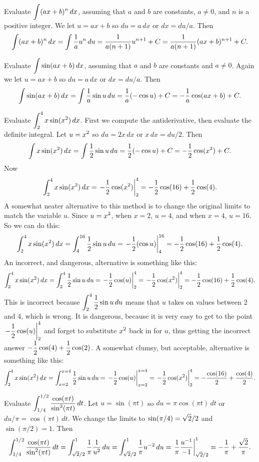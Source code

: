\example
Evaluate $\displaystyle\int(ax+b)^n\,dx$, assuming that $a$ and $b$ are
constants, $a\not=0$, and $n$ is a positive integer.
We let $u=ax+b$ so $du=a\,dx$ or $dx=du/a$. Then
$$
  \int(ax+b)^n\,dx=\int {1\over a} u^n\,du={1\over a(n+1)}u^{n+1}+C=
  {1\over a(n+1)}(ax+b)^{n+1}+C.
$$
\vskip-10pt\endexample

\example
Evaluate $\displaystyle\int \sin(ax+b)\,dx$, assuming that $a$ and $b$ are
constants and $a\not=0$.
Again we let $u=ax+b$ so $du=a\,dx$ or $dx=du/a$. Then
$$
  \int\sin(ax+b)\,dx=\int {1\over a} \sin u\,du={1\over a}(-\cos u)+C=
-{1\over a}\cos(ax+b)+C.
$$
\vskip-10pt\endexample

\example
Evaluate $\displaystyle\int_2^4 x\sin(x^2)\,dx$. First we compute the
antiderivative, then evaluate the definite integral.
Let $\displaystyle u=x^2$ so $du=2x\,dx$ or $x\,dx=du/2$. Then
$$
  \int x\sin(x^2)\,dx=\int {1\over 2} \sin u\,du={1\over 2}(-\cos u)+C=
  -{1\over 2}\cos(x^2)+C.
$$
Now
$$
  \int_2^4 x\sin(x^2)\,dx=\left.-{1\over 2}\cos(x^2)\right|_2^4
  =-{1\over 2}\cos(16)+{1\over 2}\cos(4).
$$
A somewhat neater alternative to this method is to change the original
limits to match the variable $u$. Since $\displaystyle u=x^2$, when $x=2$, $u=4$,
and when $x=4$, $u=16$. So we can do this:
$$
  \int_2^4 x\sin(x^2)\,dx=
  \int_4^{16} {1\over 2} \sin u\,du=\left.-{1\over 2}(\cos u)\right|_4^{16}
  =-{1\over 2}\cos(16)+{1\over 2}\cos(4).
$$
An incorrect, and dangerous, alternative is something like this:
$$
  \int_2^4 x\sin(x^2)\,dx=\int_2^4 {1\over 2} \sin u\,du=
  \left.-{1\over 2}\cos (u)\right|_2^4=
  \left.-{1\over 2}\cos(x^2)\right|_2^4=-{1\over 2}\cos(16)+{1\over
  2}\cos(4).
$$
This is incorrect because $\displaystyle\int_2^4 {1\over 2} \sin u\,du$
means that $u$ takes on values between 2 and 4, which is wrong. It
is dangerous, because it is very easy to get to 
the point $\displaystyle\left.-{1\over 2}\cos (u)\right|_2^4$ and forget to substitute
$\displaystyle x^2$ back in for $u$, thus getting the incorrect answer
$\displaystyle -{1\over 2}\cos(4)+{1\over 2}\cos(2)$. A somewhat clumsy, but
acceptable, alternative is something like this:
$$
  \int_2^4 x\sin(x^2)\,dx=\int_{x=2}^{x=4} {1\over 2} \sin u\,du=
  \left.-{1\over 2}\cos (u)\right|_{x=2}^{x=4}=
  \left.-{1\over 2}\cos(x^2)\right|_2^4=-{\cos(16)\over 2}+{\cos(4)\over2}.
$$
\vskip-10pt\endexample

\example
Evaluate $\displaystyle\int_{1/4}^{1/2}{\cos(\pi t)\over\sin^2(\pi t)}\,dt$.
Let $u=\sin(\pi t)$ so $du=\pi\cos(\pi t)\,dt$ or $du/\pi=\cos(\pi
t)\,dt$. We change the limits to $\displaystyle \sin(\pi/4)=\sqrt2/2$ and 
$\sin(\pi/2)=1$.
Then
$$
  \int_{1/4}^{1/2}{\cos(\pi t)\over\sin^2(\pi t)}\,dt=
  \int_{\sqrt2/2}^{1}{1\over \pi}{1\over u^2}\,du=
  \int_{\sqrt2/2}^{1} {1\over \pi}u^{-2}\,du=
  \left.{1\over \pi}{u^{-1}\over -1}\right|_{\sqrt2/2}^{1}=
  -{1\over\pi}+{\sqrt2\over\pi}.
$$
\vskip-10pt\endexample


